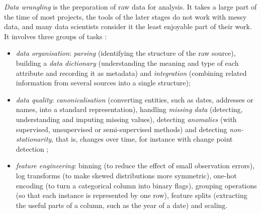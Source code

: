 \emph{Data wrangling} is the preparation of raw data for analysis. It takes a large part of the time
of most projects, the tools of the later stages do not work with messy data, and many data scientists
consider it the least enjoyable part of their work. It involves three groups of tasks
\citep{rahm2000data}:
\begin{itemize}
  \item \emph{data organisation}: \emph{parsing} (identifying the structure of the raw source),
        building a \emph{data dictionary} (understanding the meaning and type of each attribute and
        recording it as metadata) and \emph{integration} (combining related information from several
        sources into a single structure);
  \item \emph{data quality}: \emph{canonicalisation} (converting entities, such as dates, addresses
        or names, into a standard representation), handling \emph{missing data} (detecting,
        understanding and imputing missing values), detecting \emph{anomalies} (with supervised,
        unsupervised or semi-supervised methods) and detecting \emph{non-stationarity}, that is,
        changes over time, for instance with change point detection \citep{aminikhanghahi2017survey};
  \item \emph{feature engineering}: binning (to reduce the effect of small observation errors), log
        transforms (to make skewed distributions more symmetric), one-hot encoding (to turn a
        categorical column into binary flags), grouping operations (so that each instance is
        represented by one row), feature splits (extracting the useful parts of a column, such as the
        year of a date) and scaling.
\end{itemize}

